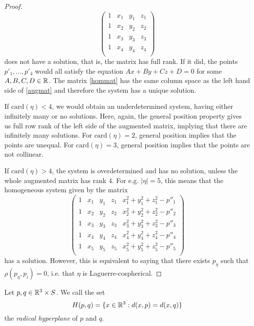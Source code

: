 \begin{proof}
\begin{equation}
	\begin{pmatrix}
		1 & x_1 & y_1 & z_1 \\
		1 & x_2 & y_2 & z_2 \\
		1 & x_3 & y_3 & z_3 \\
		1 & x_4 & y_4 & z_4 \\
	\end{pmatrix}
	\end{equation}
	does not have a solution, that is, the matrix has full rank. If it did, the points $p'_1,\dots,p'_4$ would all satisfy the equation $Ax+By+Cz+D=0$ for some $A,B,C,D \in \mathbb{R}$. The matrix \ref{hommat} has the same column space as the left hand side of \ref{augmat} and therefore the system has a unique solution.

	If $\mathrm{card}(\eta)<4$, we would obtain an underdetermined system, having either infinitely many or no solutions.  Here, again, the general position property gives us full row rank of the left side of the augmented matrix, implying that there are infinitely many solutions. For $\mathrm{card}(\eta)=2$, general position implies that the points are unequal. For $\mathrm{card}(\eta) =3$, general position implies that the points are not collinear.


	If $\mathrm{card}(\eta)>4$, the system is overdetermined and has no solution, unless the whole augmented matrix has rank $4$. For e.g. $|\eta|=5$, this means that the homogeneous system given by the matrix 
	\begin{equation}\label{circmat}
	\begin{pmatrix}
		1 & x_1 & y_1 & z_1 & x_1^2 + y_1^2 + z_1^2 - p''_1  \\
		1 & x_2 & y_2 & z_2 & x_2^2 + y_2^2 + z_2^2 - p''_2  \\
		1 & x_3 & y_3 & z_3 & x_3^2 + y_3^2 + z_3^2 - p''_3  \\
		1 & x_4 & y_4 & z_4 & x_4^2 + y_4^2 + z_4^2 - p''_4  \\
		1 & x_5 & y_5 & z_5 & x_5^2 + y_5^2 + z_5^2 - p''_5  \\
	\end{pmatrix}
	\end{equation}
	has a solution. However, this is equivalent to saying that there exists $p_\eta$ such that $\rho(p_\eta,p_i)=0$, i.e. that $\eta$ is Laguerre-cospherical.
\end{proof}

\begin{definition} Let $p,q \in {\mathbb R^3}\times S$. We call the set 
	$$H(p,q) = \{ x\in {\mathbb R^3}: d(x,p) = d(x,q) \}$$
	the \textit{radical hyperplane} of $p$ and $q$.
\end{definition}

